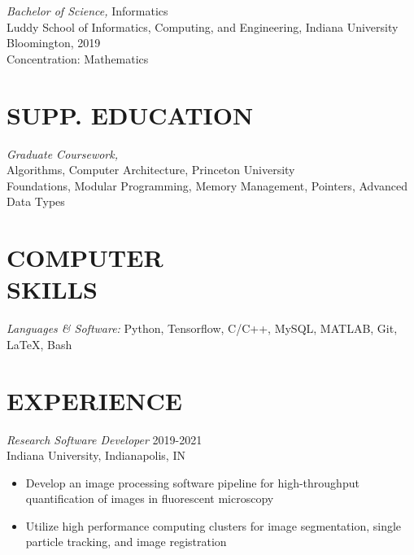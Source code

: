 \documentclass[margin, 10pt]{res} %
\begin{document}
\begin{resume}
{\sl Bachelor of Science,} Informatics \\
Luddy School of Informatics, Computing, and Engineering, Indiana University Bloomington, 2019\\
Concentration: Mathematics 
 
\section{SUPP. EDUCATION} 

{\sl Graduate Coursework,} \\
Algorithms, Computer Architecture, Princeton University\\
Foundations, Modular Programming, Memory Management, Pointers, Advanced Data Types



\section{COMPUTER \\ SKILLS} 

{\sl Languages \& Software:} 
Python, Tensorflow, C/C++, MySQL, MATLAB, Git, LaTeX, Bash\\
 
 
\section{EXPERIENCE}

{\sl Research Software Developer} \hfill 2019-2021 \\
Indiana University, Indianapolis, IN

\begin{itemize} \itemsep -2pt %

\item Develop an image processing software pipeline for high-throughput quantification of images in fluorescent microscopy

\item Utilize high performance computing clusters for image segmentation, single particle tracking, and image registration
 

\end{itemize}
\end{resume}
\end{document}
